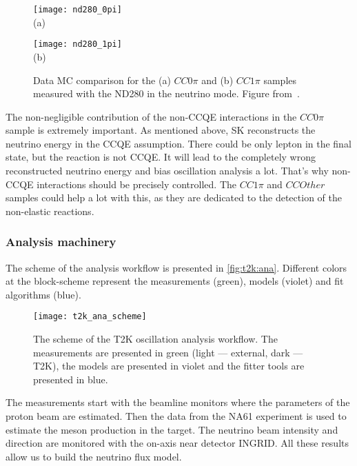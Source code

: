 \documentclass[../main.tex]{subfiles}
\begin{document}
\begin{figure}[!ht]
  \centering
  \begin{minipage}{0.49\linewidth}
    \centering
    \texttt{[image: nd280\_0pi]} \\ (a)
  \end{minipage}
  \begin{minipage}{0.49\linewidth}
    \centering
    \texttt{[image: nd280\_1pi]} \\ (b)
  \end{minipage}
    \caption{Data MC comparison for the (a) $CC0\pi$ and (b) $CC1\pi$ samples measured with the ND280 in the neutrino mode. Figure from~\cite{Abe2017}.}
    \label{fig:T2K:nd_obs}
\end{figure}

The non-negligible contribution of the non-CCQE interactions in the $CC0\pi$ sample is extremely important. As mentioned above, SK reconstructs the neutrino energy in the CCQE assumption. There could be only lepton in the final state, but the reaction is not CCQE. It will lead to the completely wrong reconstructed neutrino energy and bias oscillation analysis a lot. That's why non-CCQE interactions should be precisely controlled. The $CC1\pi$ and $CCOther$ samples could help a lot with this, as they are dedicated to the detection of the non-elastic reactions.

\subsubsection{Analysis machinery}
The scheme of the analysis workflow is presented in \autoref{fig:t2k:ana}. Different colors at the block-scheme represent the measurements (green), models (violet) and fit algorithms (blue).

\begin{figure}[!ht]
  \centering
  \texttt{[image: t2k\_ana\_scheme]}
  \caption{The scheme of the T2K oscillation analysis workflow. The measurements are presented in green (light --- external, dark --- T2K), the models are presented in violet and the fitter tools are presented in blue.}
  \label{fig:t2k:ana}
\end{figure}

The measurements start with the beamline monitors where the parameters of the proton beam are estimated. Then the data from the NA61 experiment is used to estimate the meson production in the target. The neutrino beam intensity and direction are monitored with the on-axis near detector INGRID. All these results allow us to build the neutrino flux model.
\end{document}
